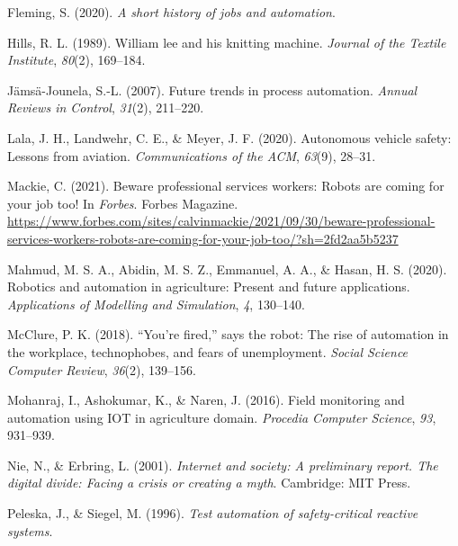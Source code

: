 \documentclass[
  man]{apa7}
\newlength{\cslhangindent}
\newlength{\cslentryspacingunit} %
\newenvironment{CSLReferences}[2] %
 {%
  \setlength{\parindent}{0pt}
  \ifodd #1
  \let\oldpar\par
  \def\par{\hangindent=\cslhangindent\oldpar}
  \fi
  \setlength{\parskip}{#2\cslentryspacingunit}
 }%
 {}
\begin{document}
\begin{CSLReferences}{1}{0}
\leavevmode{}%
Fleming, S. (2020). \emph{A short history of jobs and automation}.

\leavevmode{}%
Hills, R. L. (1989). William lee and his knitting machine. \emph{Journal of the Textile Institute}, \emph{80}(2), 169--184.

\leavevmode{}%
Jämsä-Jounela, S.-L. (2007). Future trends in process automation. \emph{Annual Reviews in Control}, \emph{31}(2), 211--220.

\leavevmode{}%
Lala, J. H., Landwehr, C. E., \& Meyer, J. F. (2020). Autonomous vehicle safety: Lessons from aviation. \emph{Communications of the ACM}, \emph{63}(9), 28--31.

\leavevmode{}%
Mackie, C. (2021). Beware professional services workers: Robots are coming for your job too! In \emph{Forbes}. Forbes Magazine. \url{https://www.forbes.com/sites/calvinmackie/2021/09/30/beware-professional-services-workers-robots-are-coming-for-your-job-too/?sh=2fd2aa5b5237}

\leavevmode{}%
Mahmud, M. S. A., Abidin, M. S. Z., Emmanuel, A. A., \& Hasan, H. S. (2020). Robotics and automation in agriculture: Present and future applications. \emph{Applications of Modelling and Simulation}, \emph{4}, 130--140.

\leavevmode{}%
McClure, P. K. (2018). {``You're fired,''} says the robot: The rise of automation in the workplace, technophobes, and fears of unemployment. \emph{Social Science Computer Review}, \emph{36}(2), 139--156.

\leavevmode{}%
Mohanraj, I., Ashokumar, K., \& Naren, J. (2016). Field monitoring and automation using IOT in agriculture domain. \emph{Procedia Computer Science}, \emph{93}, 931--939.

\leavevmode{}%
Nie, N., \& Erbring, L. (2001). \emph{Internet and society: A preliminary report. The digital divide: Facing a crisis or creating a myth}. Cambridge: MIT Press.

\leavevmode{}%
Peleska, J., \& Siegel, M. (1996). \emph{Test automation of safety-critical reactive systems}.


\end{CSLReferences}
\end{document}
